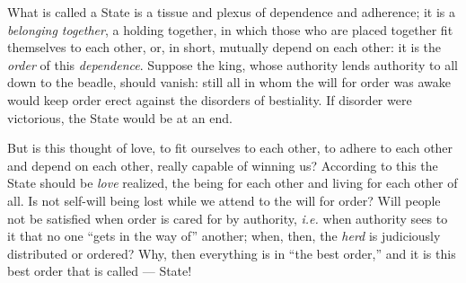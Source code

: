 \myhrule


What is called a State is a tissue and plexus of dependence and adherence; it 
is a \textit{belonging together}, a holding together, in which those who are 
placed together fit themselves to each other, or, in short, mutually depend on 
each other: it is the \textit{order} of this \textit{dependence}. Suppose the 
king, whose authority lends authority to all down to the beadle, should 
vanish: still all in whom the will for order was awake would keep order erect 
against the disorders of bestiality. If disorder were victorious, the State 
would be at an end.

But is this thought of love, to fit ourselves to each other, to adhere to each 
other and depend on each other, really capable of winning us? According to 
this the State should be \textit{love} realized, the being for each other and 
living for each other of all. Is not self-will being lost while we attend to 
the will for order? Will people not be satisfied when order is cared for by 
authority, \textit{i.e.} when authority sees to it that no one ``gets in the 
way of'' another; when, then, the \textit{herd} is judiciously distributed or 
ordered? Why, then everything is in ``the best order,'' and it is this best 
order that is called --- State!

